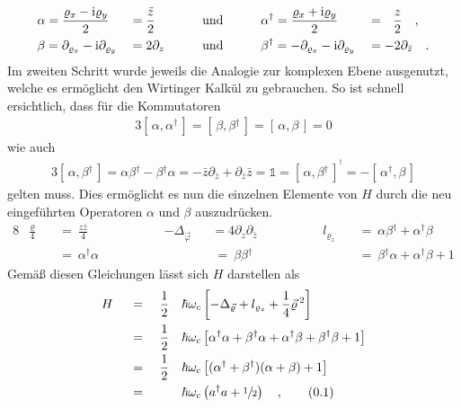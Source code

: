 \documentclass[a4paper,11pt, twoside]{article}
\newcommand{\ind}[2]{{_{#1}^{#2}}}
\newcommand{\+}{\dagger}
\newcommand{\com}[2]{[\, #1, #2 \,]}
\newcommand\numberthis{\stepcounter{equation} \tag{\thesection.\theequation}}
\renewcommand{\v}{\vec}
\renewcommand{\^}{\hat}
\renewcommand{\tt}{\text}
\renewcommand{\~}{\widetilde}
\begin{document}
\begin{alignat*}{5}
& \alpha = \frac{\varrho_x-\tt i \varrho_y}{2}&&=\frac{\bar z}{2} && \qquad \tt{und} \qquad && \alpha\ind{}{\+} = \frac{\varrho_x+\tt i \varrho_y}{2}&&=\ \ \frac{ z}{2} \quad, \\
& \beta = \partial_{\varrho_x}-\tt i \partial_{\varrho_y}&&=2\partial_z && \qquad \tt{und} \qquad && \beta\ind{}{\+} = -\partial_{\varrho_x}-\tt i \partial_{\varrho_y}&&=-2\partial_{\bar z} \quad.
\end{alignat*}
Im zweiten Schritt wurde jeweils die Analogie zur komplexen Ebene ausgenutzt, welche es ermöglicht den Wirtinger Kalkül zu gebrauchen. So ist schnell ersichtlich, dass für die Kommutatoren 
\begin{alignat*}{3}
 \com{\alpha}{\alpha\ind{}{\+}} = \com{\beta}{\beta\ind{}{\+}} = \com{\alpha}{\beta} = 0
\end{alignat*}
wie auch 
\begin{alignat*}{3}
\com{\alpha}{\beta\ind{}{\+}} = \alpha\beta\ind{}{\+} - \beta\ind{}{\+}\alpha= -\bar z\partial_{\bar z} + \partial_{\bar z} \bar z  =  \mathds{1} 
= \com{\alpha}{\beta\ind{}{\+}}^{^{\scriptstyle \+}} = - \com{\alpha\ind{}{\+}}{\beta}
\end{alignat*}
gelten muss. Dies ermöglicht es nun die einzelnen Elemente von $H$ durch die neu eingeführten Operatoren $\alpha$ und $\beta$ auszudrücken. 
\begin{alignat*}{8}
& \frac{\varrho}{4}&&\ =\  \frac{z\bar z }{4}  &&\qquad && -\Delta_{\v \varphi}&&= 4\partial_z\partial_{\bar z}
&& \qquad && l_{\varrho_z}  &&\ =\  \alpha\beta\ind{}{\+} + \alpha\ind{}{\+}\beta  \\
& &&\ =\  \alpha\ind{}{\+}\alpha && && &&\ =\ \beta\beta\ind{}{\+}  && && && \ =\ \beta\ind{}{\+}\alpha + \alpha\ind{}{\+}\beta +1 
\end{alignat*}
Gemäß diesen Gleichungen lässt sich $H$ darstellen als 
\begin{alignat*}{4}
& H &&\ = \ && \frac{1}{2}&&\hbar\omega _c \left [-\Delta_{\v \varrho} + l_{\varrho_z} +\frac{1}{4}\v \varrho\, ^2\right ] \\
& &&\ = \ &&\frac{1}{2}&&\hbar\omega_c \left [\alpha\ind{}{\+}\alpha + \beta\ind{}{\+}\alpha + \alpha\ind{}{\+}\beta +\beta\ind{}{\+}\beta+1\right ] \\
& &&\ = \ && \frac{1}{2}&&\hbar\omega_c \left [(\alpha\ind{}{\+}+\beta\ind{}{\+})(\alpha+\beta)+1\right ] \\
& &&\ = \ && &&\hbar\omega_c \left (a\ind{}{\+}a+\sfrac{1}{2}\right )\quad , \numberthis \label{Landau Hamiltonian Elektron}
\end{alignat*}
\end{document}
